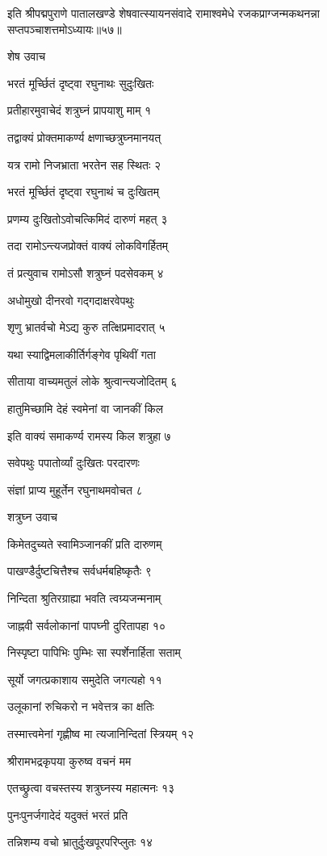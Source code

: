 इति श्रीपद्मपुराणे पातालखण्डे शेषवात्स्यायनसंवादे रामाश्वमेधे रजकप्राग्जन्मकथनन्ना सप्तपञ्चाशत्तमोऽध्यायः॥५७॥


शेष उवाच

भरतं मूर्च्छितं दृष्ट्वा रघुनाथः सुदुःखितः

प्रतीहारमुवाचेदं शत्रुघ्नं प्रापयाशु माम् १

तद्वाक्यं प्रोक्तमाकर्ण्य क्षणाच्छत्रुघ्नमानयत्

यत्र रामो निजभ्राता भरतेन सह स्थितः २

भरतं मूर्च्छितं दृष्ट्वा रघुनाथं च दुःखितम्

प्रणम्य दुःखितोऽवोचत्किमिदं दारुणं महत् ३

तदा रामोऽन्त्यजप्रोक्तं वाक्यं लोकविगर्हितम्

तं प्रत्युवाच रामोऽसौ शत्रुघ्नं पदसेवकम् ४

अधोमुखो दीनरवो गद्गदाक्षरवेपथुः

शृणु भ्रातर्वचो मेऽद्य कुरु तत्क्षिप्रमादरात् ५

यथा स्याद्विमलाकीर्तिर्गङ्गेव पृथिवीं गता

सीताया वाच्यमतुलं लोके श्रुत्वान्त्यजोदितम् ६

हातुमिच्छामि देहं स्वमेनां वा जानकीं किल

इति वाक्यं समाकर्ण्य रामस्य किल शत्रुहा ७

सवेपथुः पपातोर्व्यां दुःखितः परदारणः

संज्ञां प्राप्य मुहूर्तेन रघुनाथमवोचत ८

शत्रुघ्न उवाच

किमेतदुच्यते स्वामिञ्जानकीं प्रति दारुणम्

पाखण्डैर्दुष्टचित्तैश्च सर्वधर्मबहिष्कृतैः ९

निन्दिता श्रुतिरग्राह्या भवति त्वग्र्यजन्मनाम्

जाह्नवी सर्वलोकानां पापघ्नी दुरितापहा १०

निस्पृष्टा पापिभिः पुम्भिः सा स्पर्शेनार्हिता सताम्

सूर्यो जगत्प्रकाशाय समुदेति जगत्यहो ११

उलूकानां रुचिकरो न भवेत्तत्र का क्षतिः

तस्मात्त्वमेनां गृह्णीष्व मा त्यजानिन्दितां स्त्रियम् १२

श्रीरामभद्रकृपया कुरुष्व वचनं मम

एतच्छ्रुत्वा वचस्तस्य शत्रुघ्नस्य महात्मनः १३

पुनःपुनर्जगादेदं यदुक्तं भरतं प्रति

तन्निशम्य वचो भ्रातुर्दुःखपूरपरिप्लुतः १४

